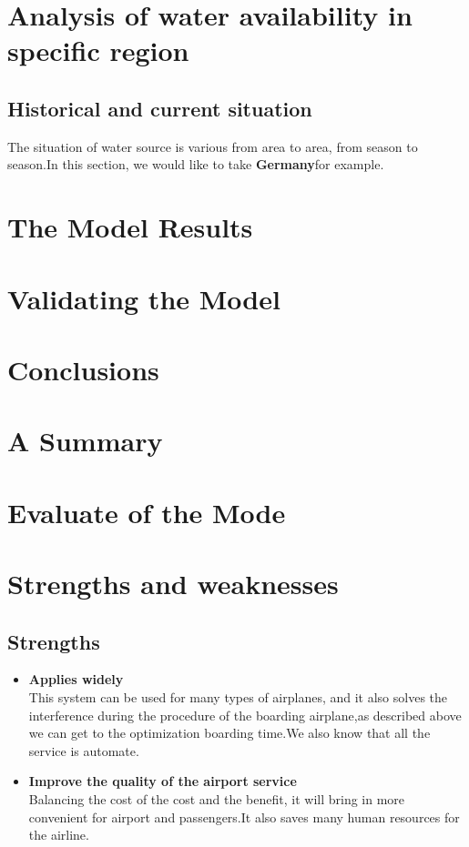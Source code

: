 \documentclass{mcmthesis}
\begin{document}
\section{Analysis of water availability in specific region}

\subsection{Historical and current situation}
	The situation of water source is various from area to area, from season to season.In this section, we would like to take      \textbf{Germany}for example.
\section{The Model Results}


\section{Validating the Model}


\section{Conclusions}


\section{A Summary}


\section{Evaluate of the Mode}

\section{Strengths and weaknesses}


\subsection{Strengths}
\begin{itemize}
\item \textbf{Applies widely}\\
This  system can be used for many types of airplanes, and it also
solves the interference during  the procedure of the boarding
airplane,as described above we can get to the  optimization
boarding time.We also know that all the service is automate.
\item \textbf{Improve the quality of the airport service}\\
Balancing the cost of the cost and the benefit, it will bring in
more convenient  for airport and passengers.It also saves many
human resources for the airline. 
\end{itemize}
\end{document}
